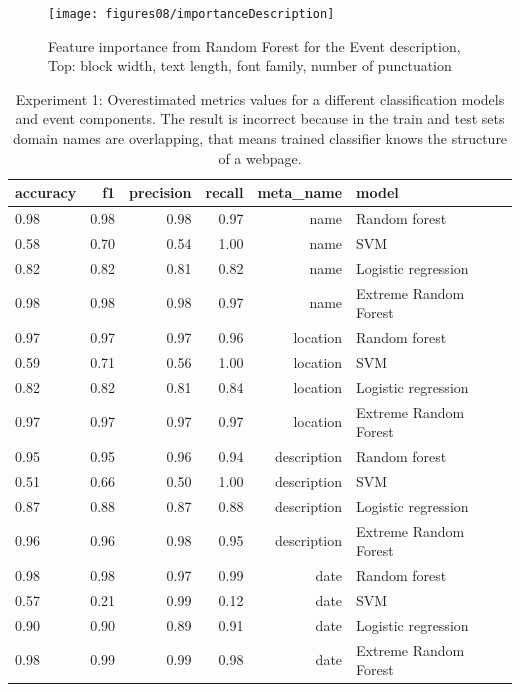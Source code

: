 \begin{figure}[h]
\begin{center}
\texttt{[image: figures08/importanceDescription]}
\caption{Feature importance from Random Forest for the Event description, Top: block width, text length, font family, number of punctuation}
\label{fig:importanceDescription}
\end{center}
\end{figure}


\begin{table}[h]
\begin{center}
{\renewcommand{\arraystretch}{1.2}
\begin{tabular}{lrrrrll}
\toprule
accuracy &    f1 &  precision &  recall &    meta\_name &                  model \\
\midrule
0.98 &  0.98 &       0.98 &    0.97 &         name &          Random forest \\
0.58 &  0.70 &       0.54 &    1.00 &         name &                    SVM \\
0.82 &  0.82 &       0.81 &    0.82 &         name &    Logistic regression \\
0.98 &  0.98 &       0.98 &    0.97 &         name &  Extreme Random Forest \\
\midrule
0.97 &  0.97 &       0.97 &    0.96 &     location &          Random forest \\
0.59 &  0.71 &       0.56 &    1.00 &     location &                    SVM \\
0.82 &  0.82 &       0.81 &    0.84 &     location &    Logistic regression \\
0.97 &  0.97 &       0.97 &    0.97 &     location &  Extreme Random Forest \\
\midrule
0.95 &  0.95 &       0.96 &    0.94 &  description &          Random forest \\
0.51 &  0.66 &       0.50 &    1.00 &  description &                    SVM \\
0.87 &  0.88 &       0.87 &    0.88 &  description &    Logistic regression \\
0.96 &  0.96 &       0.98 &    0.95 &  description &  Extreme Random Forest \\
\midrule
0.98 &  0.98 &       0.97 &    0.99 &         date &          Random forest \\
0.57 &  0.21 &       0.99 &    0.12 &         date &                    SVM \\
0.90 &  0.90 &       0.89 &    0.91 &         date &    Logistic regression \\
0.98 &  0.99 &       0.99 &    0.98 &         date &  Extreme Random Forest \\
\bottomrule
\end{tabular}}
\caption{Experiment 1: Overestimated metrics values for a different classification models and event components. The result is incorrect because in the train and test sets domain names are overlapping, that means trained classifier knows the structure of a webpage.}
\label{table:sumresultOriginal}
\end{center}
\end{table} 


